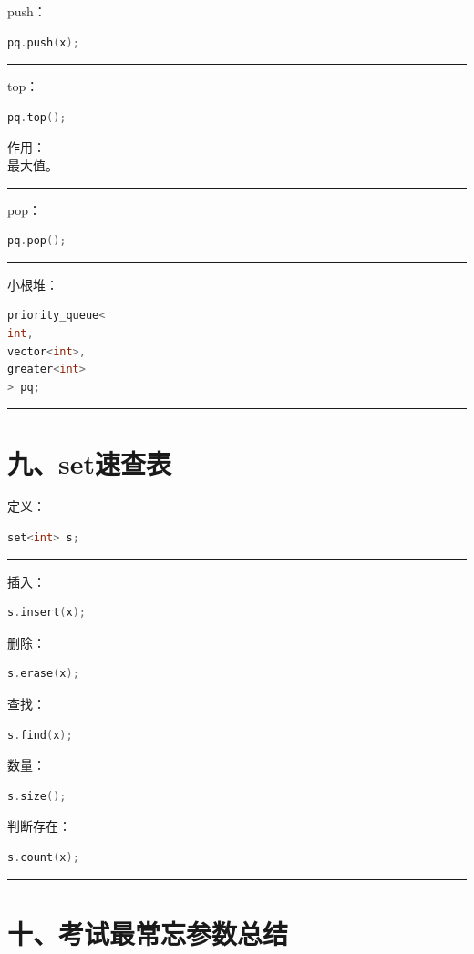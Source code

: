 \documentclass[10pt,twocolumn]{extarticle}
\begin{document}
push：
\begin{lstlisting}[language=C++]
pq.push(x);
\end{lstlisting}

\noindent\rule{\linewidth}{0.4pt}

top：
\begin{lstlisting}[language=C++]
pq.top();
\end{lstlisting}
作用：\\
最大值。

\noindent\rule{\linewidth}{0.4pt}

pop：
\begin{lstlisting}[language=C++]
pq.pop();
\end{lstlisting}

\noindent\rule{\linewidth}{0.4pt}

小根堆：
\begin{lstlisting}[language=C++]
priority_queue<
int,
vector<int>,
greater<int>
> pq;
\end{lstlisting}

\noindent\rule{\linewidth}{0.4pt}

\section{九、set速查表}

定义：
\begin{lstlisting}[language=C++]
set<int> s;
\end{lstlisting}

\noindent\rule{\linewidth}{0.4pt}

插入：
\begin{lstlisting}[language=C++]
s.insert(x);
\end{lstlisting}
删除：
\begin{lstlisting}[language=C++]
s.erase(x);
\end{lstlisting}
查找：
\begin{lstlisting}[language=C++]
s.find(x);
\end{lstlisting}
数量：
\begin{lstlisting}[language=C++]
s.size();
\end{lstlisting}
判断存在：
\begin{lstlisting}[language=C++]
s.count(x);
\end{lstlisting}

\noindent\rule{\linewidth}{0.4pt}

\section{十、考试最常忘参数总结}
\end{document}
